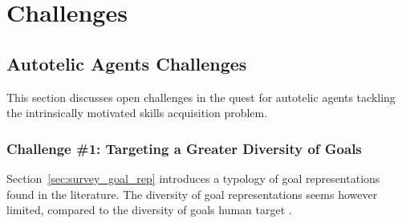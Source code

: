 
\chapter{Challenges}
\minitoc
\section{Autotelic Agents Challenges}

\label{sec:future}
This section discusses open challenges in the quest for autotelic agents tackling the intrinsically motivated skills acquisition problem. 

\subsection{Challenge \#1: Targeting a Greater Diversity of Goals}
\label{sec:future_diversity}
Section~\ref{sec:survey_goal_rep} introduces a typology of goal representations found in the literature. The diversity of goal representations seems however limited, compared to the diversity of goals human target \cite{ram1995goal}.

